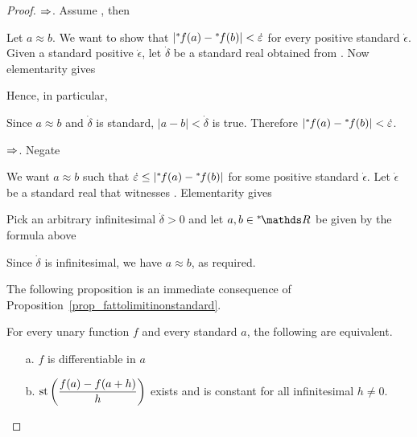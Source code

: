 \begin{proof}
$\Rightarrow$.
Assume , then


Let $a\approx b$.
We want to show that $|{}^*\kern-.2ex f(a)-{}^*\kern-.2ex f(b)|<\dot{\varepsilon}$ for every positive standard $\dot\epsilon$.
Given a standard positive $\dot\epsilon$, let $\dot\delta$ be a standard real obtained from .
Now elementarity gives


Hence, in particular,

\ceq{\hfill\ns\RR}{\models}{\phantom{\A\,\epsilon>0\ \E\,\delta>0\ \A x, y\ \Big[}|a-b|<\dot\delta\ \ \imp\ \ |fa-fb|<\dot\epsilon.}

Since $a\approx b$ and $\dot\delta$ is standard, $|a-b|<\dot\delta$ is true.
Therefore $|{}^*\kern-.2ex f(a)-{}^*\kern-.2ex f(b)|<\dot{\varepsilon}$.

$\Rightarrow$.
Negate 


We want  $a\approx b$ such that $\dot{\varepsilon}\le|{}^*\kern-.2ex f(a)-{}^*\kern-.2ex f(b)|$ for some positive standard $\dot\epsilon$.
Let $\dot\epsilon$ be a standard real that witnesses .
Elementarity gives


Pick an arbitrary infinitesimal $\dot\delta>0$ and let $a,b\in\nsR$ be given by the formula above

\ceq{\hfill\ns\RR}{\models}{\phantom{\E\,\epsilon>0\ \A\,\delta>0\ \E x, y\ \Big[}|a-b|<\delta\ \ \wedge\ \ \dot\epsilon\le|fa-fb|.}

Since $\dot\delta$ is infinitesimal, we have $a\approx b$, as required.

The following proposition is an immediate consequence of Proposition~\ref{prop_fattolimitinonstandard}.

\begin{proposition}
For every unary function $f$ and every standard $a$, the following are equivalent.
\begin{itemize}
\item[a.] $f$ is differentiable in $a$
\item[b.] ${\rm st}\left(\displaystyle\frac{f(a)-f(a+h)}{h}\right)$ exists and is constant for all infinitesimal $h\neq0$.
\end{itemize}
\end{proposition}



\end{proof}
